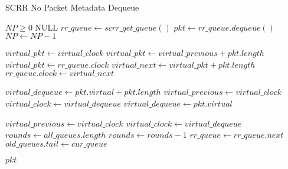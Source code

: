 \begin{algorithm}[thb!]
\caption{SCRR No Packet Metadata Dequeue}
\label{alg:scrr-npm-deq}
\begin{algorithmic}
\Require $NP \ge 0$
\Return NULL
\EndIf
\Repeat
\State $rr\_queue \gets scrr\_get\_queue()$
\State $pkt \gets rr\_queue.dequeue()$
\State $NP \gets NP - 1$

\State $virtual\_pkt \gets virtual\_clock$
\Else
\State $virtual\_pkt \gets virtual\_previous + pkt.length$
\EndIf
\Else
\State $virtual\_pkt \gets rr\_queue.clock$
\EndIf
\State $virtual\_next \gets virtual\_pkt + pkt.length$
\State $rr\_queue.clock \gets virtual\_next$

\State $virtual\_dequeue \gets pkt.virtual + pkt.length$
\State $virtual\_previous \gets virtual\_clock$
\State $virtual\_clock \gets virtual\_dequeue$
\State $virtual\_dequeue \gets pkt.virtual$
\EndIf

\State $virtual\_previous \gets virtual\_clock$
\State $virtual\_clock \gets virtual\_dequeue$
\State $rounds \gets all\_queues.length$
\EndIf
\State $rounds \gets rounds - 1$
\State $rr\_queue \gets rr\_queue.next$
\State $old\_queues.tail \gets cur\_queue$
\EndIf

\Return $pkt$
\EndFunction
\end{algorithmic}
\end{algorithm}

